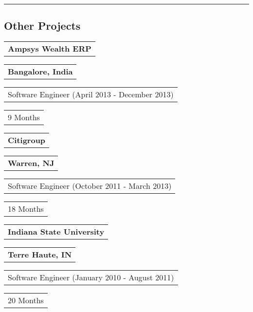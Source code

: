 \documentclass[letterpaper,10pt]{article}
\begin{document}
    \noindent\rule{\textwidth}{0.5pt}
    \subsection{Other Projects}


    \vspace{0.25cm}
    \noindent
    \begin{tabular}[t]{@{}l}
    \textbf{Ampsys Wealth ERP}
    \end{tabular}
    \hfill
    \begin{tabular}[t]{l@{}}
    \textbf{Bangalore, India}
    \end{tabular}
    \noindent\newline
    \begin{tabular}[t]{@{}l}
    Software Engineer (April 2013 - December 2013)
    \end{tabular}
    \hfill
    \begin{tabular}[t]{l@{}}
    9 Months
    \end{tabular}


    \vspace{0.25cm}
    \noindent
    \begin{tabular}[t]{@{}l}
    \textbf{Citigroup}
    \end{tabular}
    \hfill
    \begin{tabular}[t]{l@{}}
    \textbf{Warren, NJ}
    \end{tabular}
    \noindent\newline
    \begin{tabular}[t]{@{}l}
    Software Engineer (October 2011 - March 2013)
    \end{tabular}
    \hfill
    \begin{tabular}[t]{l@{}}
    18 Months
    \end{tabular}


    \vspace{0.25cm}
    \noindent
    \begin{tabular}[t]{@{}l}
    \textbf{Indiana State University}
    \end{tabular}
    \hfill
    \begin{tabular}[t]{l@{}}
    \textbf{Terre Haute, IN}
    \end{tabular}
    \noindent\newline
    \begin{tabular}[t]{@{}l}
    Software Engineer (January 2010 - August 2011)
    \end{tabular}
    \hfill
    \begin{tabular}[t]{l@{}}
    20 Months
    \end{tabular}
\end{document}

